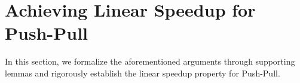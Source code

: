 \documentclass[10pt]{article}
\newcommand{\EE}{\mathbb{E}}
\newcommand{\pushpull}{{\sc Push-Pull}\xspace}
\newcommand{\revision}[1]{\textcolor{black}{#1}}
\begin{document}


\section{Achieving Linear Speedup for Push-Pull}
\label{sec:linear speedup 2}
In this section, we formalize the aforementioned arguments through supporting lemmas and rigorously establish the linear speedup property for \pushpull. 
\end{document}
